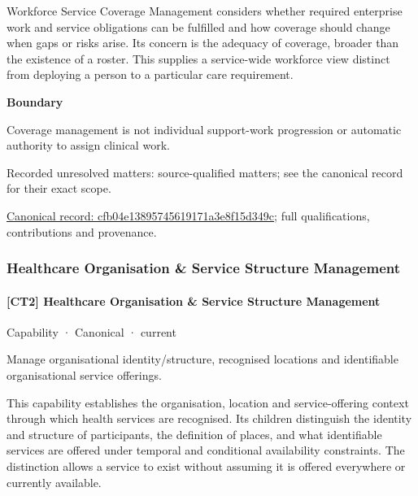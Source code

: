 Workforce Service Coverage Management considers whether required enterprise work and service obligations can be fulfilled and how coverage should change when gaps or risks arise. Its concern is the adequacy of coverage, broader than the existence of a roster. This supplies a service-wide workforce view distinct from deploying a person to a particular care requirement.



\textbf{Boundary}



Coverage management is not individual support-work progression or automatic authority to assign clinical work.


{\small Recorded unresolved matters: source-qualified matters; see the canonical record for their exact scope.}\par
{\footnotesize \href{../../../../continuum/strategy/capability/cfb04e13895745619171a3e8f15d349c.md}{Canonical record: cfb04e13895745619171a3e8f15d349c}; full qualifications, contributions and provenance.}\par
\subsubsection{Healthcare Organisation \& Service Structure Management}

\paragraph{[CT2] Healthcare Organisation \& Service Structure Management}

\label{element:de8c1b408c774e59899662495f4d6ced}
{\small Capability · Canonical · current}\par

Manage organisational identity/structure, recognised locations and identifiable organisational service offerings.



This capability establishes the organisation, location and service-offering context through which health services are recognised. Its children distinguish the identity and structure of participants, the definition of places, and what identifiable services are offered under temporal and conditional availability constraints. The distinction allows a service to exist without assuming it is offered everywhere or currently available.



